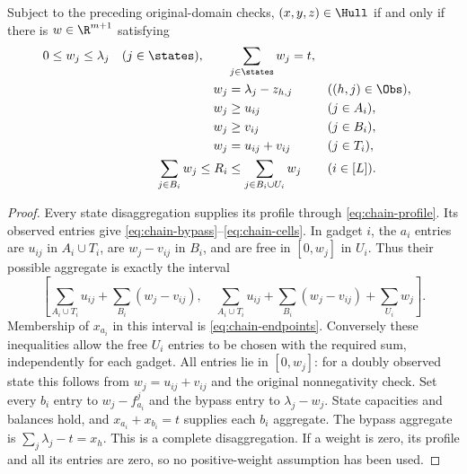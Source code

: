 \begin{proposition}\label{prop:chain-profile}
Subject to the preceding original-domain checks, $(x,y,z)\in\Hull$
if and only if there is $w\in\R^{m+1}$ satisfying
\begin{align}
 0\le w_j\le\lambda_j\quad(j\in\states),\qquad
 &\sum_{j\in\states}w_j=t,\label{eq:chain-profile-bounds}\\
 w_j&=\lambda_j-z_{h,j}&&((h,j)\in\Obs),\label{eq:chain-bypass}\\
 w_j&\ge u_{ij}&&(j\in A_i),\nonumber\\
 w_j&\ge v_{ij}&&(j\in B_i),\nonumber\\
 w_j&=u_{ij}+v_{ij}&&(j\in T_i),\label{eq:chain-cells}\\
 \sum_{j\in B_i}w_j\le R_i&\le
       \sum_{j\in B_i\cup U_i}w_j&&(i\in[L]).\label{eq:chain-endpoints}
\end{align}
\end{proposition}
\begin{proof}
Every state disaggregation supplies its profile through
\eqref{eq:chain-profile}. Its observed entries give
\eqref{eq:chain-bypass}--\eqref{eq:chain-cells}. In gadget $i$,
the $a_i$ entries are $u_{ij}$ in $A_i\cup T_i$, are $w_j-v_{ij}$
in $B_i$, and are free in $[0,w_j]$ in $U_i$. Thus their possible
aggregate is exactly the interval
\[
 \left[\sum_{A_i\cup T_i}u_{ij}+\sum_{B_i}(w_j-v_{ij}),\quad
 \sum_{A_i\cup T_i}u_{ij}+\sum_{B_i}(w_j-v_{ij})+
 \sum_{U_i}w_j\right].
\]
Membership of $x_{a_i}$ in this interval is
\eqref{eq:chain-endpoints}.
Conversely these inequalities allow the free $U_i$ entries to be
chosen with the required sum, independently for each gadget. All
entries lie in $[0,w_j]$: for a doubly observed state this follows
from $w_j=u_{ij}+v_{ij}$ and the original nonnegativity check.
Set every $b_i$ entry to $w_j-f^j_{a_i}$ and the bypass entry to
$\lambda_j-w_j$. State capacities and balances hold, and
$x_{a_i}+x_{b_i}=t$ supplies each $b_i$ aggregate. The bypass
aggregate is $\sum_j\lambda_j-t=x_h$. This is a complete
disaggregation. If a weight is zero, its profile and all its entries
are zero, so no positive-weight assumption has been used.
\end{proof}

